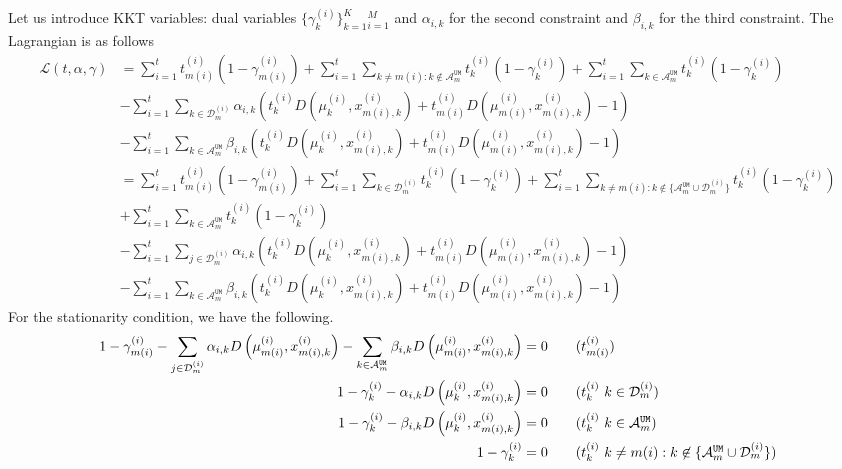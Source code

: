 \documentclass{article}
\begin{document}
Let us introduce KKT variables: dual variables $\{\gamma^{(i)}_k\}_{k=1}^{K}\phantom{}_{i=1}^M$ and $\alpha_{i,k}$ for the second constraint and $\beta_{i,k}$ for the third constraint. The Lagrangian is as follows
\begin{align*}
    \mathcal{L}(t,\alpha,\gamma) 
    &=  \sum_{i=1}^t t_{m(i)}^{(i)}(1-\gamma^{(i)}_{m(i)})+ \sum_{i=1}^t\sum_{k\neq m(i): k\not\in\mathcal{A}^{\texttt{UM}}_m} t_{k}^{(i)}(1-\gamma^{(i)}_{k})+ \sum_{i=1}^t\sum_{k\in\mathcal{A}^{\texttt{UM}}_m} t_{k}^{(i)}(1-\gamma^{(i)}_{k})\\
    &-\sum_{i=1}^t\sum_{k\in\mathcal{D}^{(i)}_{m}}\alpha_{i,k}\left( t^{(i)}_{k}D\left(\mu^{(i)}_{k},x^{(i)}_{m(i),k}\right)+t^{(i)}_{m(i)}D\left(\mu^{(i)}_{m(i)},x^{(i)}_{m(i),k}\right)-1\right)\\
    &-\sum_{i=1}^t\sum_{k\in\mathcal{A}^{\texttt{UM}}_m}\beta_{i,k}\left( t^{(i)}_{k}D\left(\mu^{(i)}_{k},x^{(i)}_{m(i),k}\right)+t^{(i)}_{m(i)}D\left(\mu^{(i)}_{m(i)},x^{(i)}_{m(i),k}\right)-1\right)\\
    &= \sum_{i=1}^t t_{m(i)}^{(i)}(1-\gamma^{(i)}_{m(i)})+ \sum_{i=1}^t\sum_{k\in \mathcal{D}_m^{(i)}} t_{k}^{(i)}(1-\gamma^{(i)}_{k})+ \sum_{i=1}^t\sum_{k\neq m(i): k\not\in\{\mathcal{A}^{\texttt{UM}}_m\cup \mathcal{D}_m^{(i)}\}} t_{k}^{(i)}(1-\gamma^{(i)}_{k})\\
    &+ \sum_{i=1}^t\sum_{k\in\mathcal{A}^{\texttt{UM}}_m} t_{k}^{(i)}(1-\gamma^{(i)}_{k})\\
     &-\sum_{i=1}^t\sum_{j\in\mathcal{D}^{(i)}_{m}}\alpha_{i,k}\left( t^{(i)}_{k}D\left(\mu^{(i)}_{k},x^{(i)}_{m(i),k}\right)+t^{(i)}_{m(i)}D\left(\mu^{(i)}_{m(i)},x^{(i)}_{m(i),k}\right)-1\right)\\
    &-\sum_{i=1}^t\sum_{k\in\mathcal{A}^{\texttt{UM}}_m}\beta_{i,k}\left( t^{(i)}_{k}D\left(\mu^{(i)}_{k},x^{(i)}_{m(i),k}\right)+t^{(i)}_{m(i)}D\left(\mu^{(i)}_{m(i)},x^{(i)}_{m(i),k}\right)-1\right)
\end{align*}
For the stationarity condition, we have the following. 
\begin{align*}
    1-\gamma^{(i)}_{m(i)}-\sum_{j\in\mathcal{D}^{(i)}_{m}}\alpha_{i,k}D\left(\mu^{(i)}_{m(i)},x^{(i)}_{m(i),k}\right)-\sum_{k\in\mathcal{A}^{\texttt{UM}}_m}\beta_{i,k}D\left(\mu^{(i)}_{m(i)},x^{(i)}_{m(i),k}\right)&=0 \tag{$t^{(i)}_{m(i)}$}\\
     1-\gamma^{(i)}_{k}-\alpha_{i,k}D\left(\mu^{(i)}_{k},x^{(i)}_{m(i),k}\right)&=0 \tag{$t^{(i)}_{k}\ k\in \mathcal{D}^{(i)}_{m}$}\\
     1-\gamma^{(i)}_{k}-\beta_{i,k}D\left(\mu^{(i)}_{k},x^{(i)}_{m(i),k}\right)&=0 \tag{$t^{(i)}_{k}\ k\in\mathcal{A}^{\texttt{UM}}_m$}\\
1-\gamma^{(i)}_{k}&=0 \tag{$t^{(i)}_{k}\ k\neq m(i): k\not\in\{\mathcal{A}^{\texttt{UM}}_m\cup \mathcal{D}_m^{(i)}\}$}
\end{align*}
\end{document}
